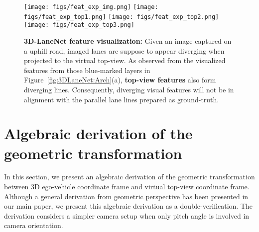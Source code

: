 \documentclass[10pt,twocolumn,letterpaper]{article}
\begin{document}
\begin{figure}[!h]
  \centering
\texttt{[image: figs/feat\_exp\_img.png]}
  \texttt{[image: figs/feat\_exp\_top1.png]}
  \texttt{[image: figs/feat\_exp\_top2.png]}
  \texttt{[image: figs/feat\_exp\_top3.png]}
\caption{\textbf{3D-LaneNet feature visualization:} Given an image captured on a uphill road, imaged lanes are suppose to appear diverging when projected to the virtual top-view. As observed from the visualized features from those blue-marked layers in Figure~\ref{fig:3DLaneNet:Arch}(a), \textbf{top-view features} also form diverging lines. Consequently, diverging visual features will not be in alignment with the parallel lane lines prepared as ground-truth.}
  \label{fig:feat:vis}
\end{figure}



\section{Algebraic derivation of the geometric transformation}
\label{sec:geo:derive}

In this section, we present an algebraic derivation of the geometric transformation between 3D ego-vehicle coordinate frame and virtual top-view coordinate frame. Although a general derivation from geometric perspective has been presented in our main paper, we present this algebraic derivation as a double-verification. The derivation considers a simpler camera setup when only pitch angle is involved in camera orientation.
\end{document}
